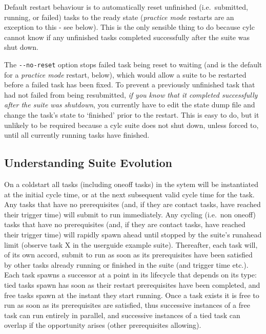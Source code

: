 \documentclass[11pt,a4paper]{article}
\begin{document}
Default restart behaviour is to automatically reset unfinished (i.e.\
submitted, running, or failed) tasks to the ready state ({\em practice
mode} restarts are an exception to this - see below).  This is the only
sensible thing to do because cylc cannot know if any unfinished tasks
completed successfully after the suite was shut down.  

The \lstinline=--no-reset= option stops failed task being reset to 
waiting (and is the default for a {\em practice mode} restart, below), 
which would allow a suite to be restarted before a failed task has been
fixed. To prevent a previously unfinished task that had not failed from
being resubmitted, {\em if you know that it completed successfully after
the suite was shutdown}, you currently have to edit the state dump file
and change the task's state to `finished' prior to the restart. This is
easy to do, but it unlikely to be required because a cylc suite does
not shut down, unless forced to, until all currently running tasks have
finished.


\subsection{Understanding Suite Evolution}
\label{UnderstandingSuiteEvolution}

On a coldstart all tasks (including oneoff tasks) in the sytem will be
instantiated at the initial cycle time, or at the next subsequent valid
cycle time for the task. Any tasks that have no prerequisites (and, if
they are contact tasks, have reached their trigger time) will submit to
run immediately. Any cycling (i.e.\ non oneoff) tasks that have no
prerequisites (and, if they are contact tasks, have reached their
trigger time) will rapidly spawn ahead until stopped by the suite's
runahead limit (observe task X in the userguide example suite).
Thereafter, each task will, of its own accord, submit to run as soon as
its prerequisites have been satisfied by other tasks already running or
finished in the suite (and trigger time etc.).  Each task spawns a
successor at a point in its lifecycle that depends on its type: tied
tasks spawn has soon as their restart prerequisites have been completed,
and free tasks spawn at the instant they start running.  Once a task
exists it is free to run as soon as its prerequisites are satisfied,
thus successive instances of a free task can run entirely in parallel,
and successive instances of a tied task can overlap if the opportunity
arises (other prerequisites allowing).
\end{document}
